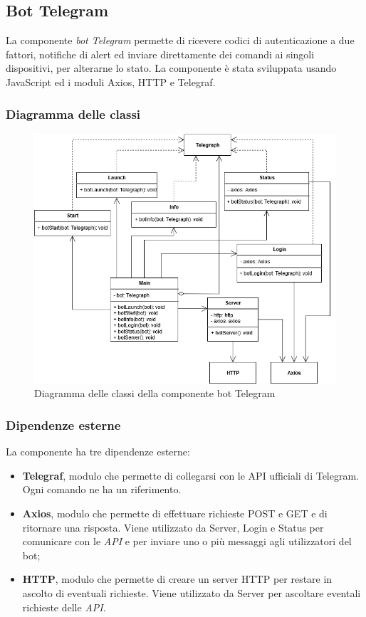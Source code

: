 \subsection{Bot Telegram}
	La componente \textit{bot Telegram} permette di ricevere codici di autenticazione a due fattori, notifiche di alert ed inviare direttamente dei comandi ai singoli dispositivi, per alterarne lo stato.
	\newline
	La componente è stata sviluppata usando JavaScript ed i moduli Axios, HTTP e Telegraf.
	 
\subsubsection{Diagramma delle classi}%
	\begin{figure}[H]
		\centering
		\includegraphics[scale=0.600]{res/images/BOTTELEGRAM/ClassiTelegram.png}
		\caption{Diagramma delle classi della componente bot Telegram}
		\label{Diagramma 19}
	\end{figure}
\subsubsection{Dipendenze esterne}	
	La componente ha tre dipendenze esterne:
	\begin{itemize}
		\item \textbf{Telegraf}, modulo che permette di collegarsi con le API ufficiali di Telegram. Ogni comando ne ha un riferimento. 
		\item \textbf{Axios}, modulo che permette di effettuare richieste POST e GET e di ritornare una risposta. Viene utilizzato da Server, Login e Status per comunicare con le \textit{API} e per inviare uno o più messaggi agli utilizzatori del bot;
		\item \textbf{HTTP}, modulo che permette di creare un server HTTP per restare in ascolto di eventuali richieste. Viene utilizzato da Server per ascoltare eventali richieste delle \textit{API}.    
	\end{itemize}
